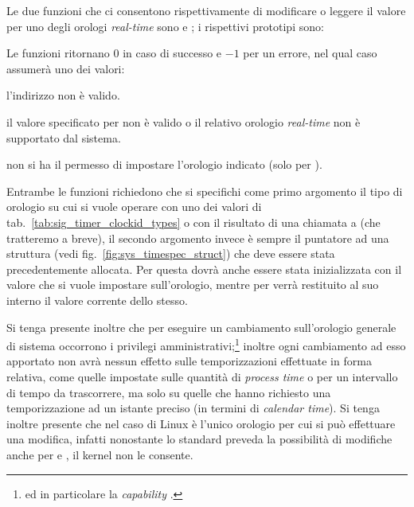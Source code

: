 Le due funzioni che ci consentono rispettivamente di modificare o leggere il
valore per uno degli orologi \textit{real-time} sono  e
; i rispettivi prototipi sono:

\begin{funcproto}{
}

{Le funzioni ritornano $0$ in caso di successo e $-1$ per un errore, nel qual
  caso  assumerà uno dei valori: 
  \begin{errlist}
  \item[\errcode{EFAULT}] l'indirizzo  non è valido.
  \item[\errcode{EINVAL}] il valore specificato per  non è
    valido o il relativo orologio \textit{real-time} non è supportato dal
    sistema.
  \item[\errcode{EPERM}] non si ha il permesso di impostare l'orologio
    indicato (solo per ).
  \end{errlist}
}
\end{funcproto}

Entrambe le funzioni richiedono che si specifichi come primo argomento il tipo
di orologio su cui si vuole operare con uno dei valori di
tab.~\ref{tab:sig_timer_clockid_types} o con il risultato di una chiamata a
 (che tratteremo a breve), il secondo argomento
invece è sempre il puntatore  ad una struttura 
(vedi fig.~\ref{fig:sys_timespec_struct}) che deve essere stata
precedentemente allocata.  Per  questa dovrà anche essere
stata inizializzata con il valore che si vuole impostare sull'orologio, mentre
per  verrà restituito al suo interno il valore corrente
dello stesso.

Si tenga presente inoltre che per eseguire un cambiamento sull'orologio
generale di sistema  occorrono i privilegi
amministrativi;\footnote{ed in particolare la \textit{capability}
  .} inoltre ogni cambiamento ad esso apportato non avrà
nessun effetto sulle temporizzazioni effettuate in forma relativa, come quelle
impostate sulle quantità di \textit{process time} o per un intervallo di tempo
da trascorrere, ma solo su quelle che hanno richiesto una temporizzazione ad
un istante preciso (in termini di \textit{calendar time}). Si tenga inoltre
presente che nel caso di Linux  è l'unico orologio per
cui si può effettuare una modifica, infatti nonostante lo standard preveda la
possibilità di modifiche anche per  e
, il kernel non le consente.

